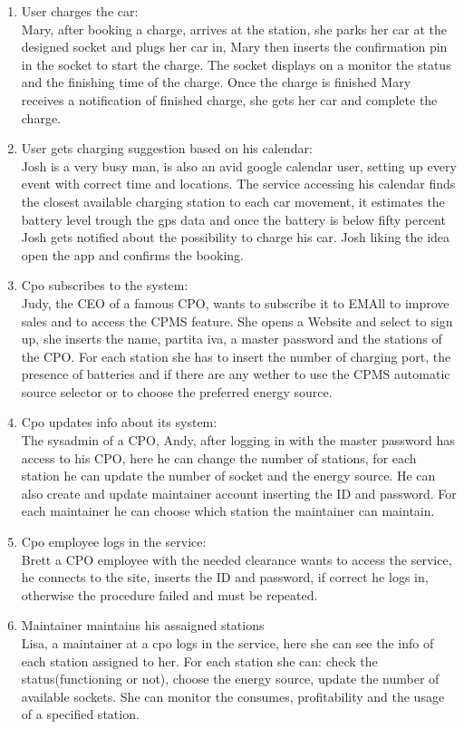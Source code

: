 \begin{enumerate}[label=S\arabic*]
      \item User charges the car:\\
            Mary, after booking a charge, arrives at the station, she parks her car at the designed socket
            and plugs her car in, Mary then inserts the confirmation pin in the socket to start the charge.
            The socket displays on a monitor the status and the finishing time of the charge.
            Once the charge is finished Mary receives a notification of finished charge,
            she gets her car and complete the charge.
      \item User gets charging suggestion based on his calendar:\\
            Josh is a very busy man, is also an avid google calendar user,
            setting up every event with correct time and locations.
            The service accessing his calendar finds the closest available charging station to each car movement,
            it estimates the battery level trough the gps data and once the battery is below fifty percent Josh gets notified
            about the possibility to charge his car.
            Josh liking the idea open the app and confirms the booking.
      \item Cpo subscribes to the system:\\
            Judy, the CEO of a famous CPO, wants to subscribe it to EMAll to improve sales and to access the CPMS feature.
            She opens a Website and select to sign up, she inserts the name, partita iva, a master password and the stations of the CPO.
            For each station she has to insert the number of charging port, the presence of batteries and if there are any
            wether to use the CPMS automatic source selector or to choose the preferred energy source.
      \item Cpo updates info about its system:\\
            The sysadmin of a CPO, Andy, after logging in with the master password has access to his CPO,
            here he can change the number of stations, for each station he can update the number of socket and the energy source.
            He can also create and update maintainer account inserting the ID and password. For each maintainer he can choose which station the maintainer can maintain.
      \item Cpo employee logs in the service:\\
            Brett a CPO employee with the needed clearance wants to access the service, he connects to the site, inserts the ID
            and password, if correct he logs in, otherwise the procedure failed and must be repeated.
      \item Maintainer maintains his assaigned stations\\
            Lisa, a maintainer at a cpo logs in the service, here she can see the info of each station assigned to her.
            For each station she can: check the status(functioning or not), choose the energy source, update the number of available sockets.
            She can monitor the consumes, profitability and the usage of a specified station.
\end{enumerate}
